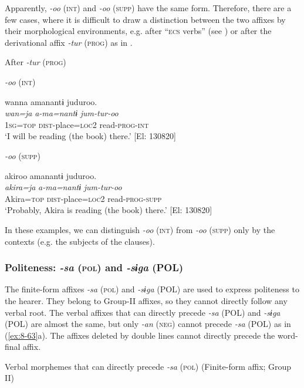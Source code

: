   Apparently, \textit{-oo} (\textsc{int}) and \textit{-oo} (\textsc{supp}) have the same form. Therefore, there are a few cases, where it is difficult to draw a distinction between the two affixes by their morphological environments, e.g. after “\textsc{ecs} verbs” (see ) or after the derivational affix \textit{-tur} (\textsc{prog}) as in .

\ea\label{ex:8-62}
  After \textit{-tur} (\textsc{prog})

\ea \textit{-oo} (\textsc{int})

{\TM}
\glll  wanna  amanantɨ  juduroo.\\
\textit{wan=ja}  \textit{a-ma=nantɨ}  \textit{jum-tur-oo}\\
1\textsc{sg}=\textsc{top}  \textsc{dist}-place=\textsc{loc}2  read-\textsc{prog}-\textsc{int}\\
\glt ‘I will be reading (the book) there.’ [El: 130820]


\ex \textit{-oo} (\textsc{supp})

{\TM}
\glll  akiroo  amanantɨ  juduroo.\\
\textit{akira=ja}  \textit{a-ma=nantɨ}  \textit{jum-tur-oo}\\
Akira=\textsc{top}  \textsc{dist}-place=\textsc{loc}2  read-\textsc{prog}-\textsc{supp}\\
\glt ‘Probably, Akira is reading (the book) there.’ [El: 130820]
\z
\z

In these examples, we can distinguish \textit{-oo} (\textsc{int}) from \textit{-oo} (\textsc{supp}) only by the contexts (e.g. the subjects of the clauses).

\subsubsection{Politeness: \textit{-sa} (\textsc{pol}) and \textit{-sɨga} (POL)}

The finite-form affixes \textit{-sa} (\textsc{pol}) and \textit{-sɨga} (POL) are used to express politeness to the hearer. They belong to Group-II affixes, so they cannot directly follow any verbal root. The verbal affixes that can directly precede \textit{-sa} (POL) and \textit{-sɨga} (POL) are almost the same, but only \textit{-an} (\textsc{neg}) cannot precede \textit{-sa} (POL) as in (\ref{ex:8-63}a). The affixes deleted by double lines cannot directly precede the word-final affix.

\ea\label{ex:8-63}
\ea Verbal morphemes that can directly precede \textit{-sa} (\textsc{pol}) (Finite-form affix; Group II)

